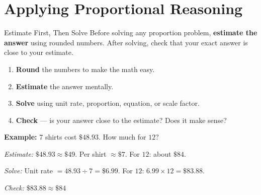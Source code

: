 \section{Applying Proportional Reasoning}

\begin{quickReview}{Estimate First, Then Solve}
Before solving any proportion problem, \textbf{estimate the answer} using rounded numbers. After solving, check that your exact answer is close to your estimate.

\begin{enumerate}[leftmargin=*]
    \item \textbf{Round} the numbers to make the math easy.
    \item \textbf{Estimate} the answer mentally.
    \item \textbf{Solve} using unit rate, proportion, equation, or scale factor.
    \item \textbf{Check} --- is your answer close to the estimate? Does it make sense?
\end{enumerate}

\medskip
\textbf{Example:} $7$ shirts cost $\$48.93$. How much for $12$?

\textit{Estimate:} $\$48.93 \approx \$49$. Per shirt $\approx \$7$. For $12$: about $\$84$.

\textit{Solve:} Unit rate $= 48.93 \div 7 = \$6.99$. For $12$: $6.99 \times 12 = \$83.88$.

\textit{Check:} $\$83.88 \approx \$84$ \checkmark
\end{quickReview}

